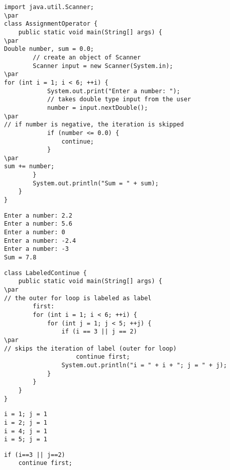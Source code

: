 \documentclass{book}
\def\lthtmlcheckvsize{\ifdim\ht\sizebox<\vsize 
  \ifdim\wd\sizebox<\hsize\expandafter\hfill\fi \expandafter\vfill
  \else\expandafter\vss\fi}%
\begin{document}
{\newpage\clearpage
{}%
\begin{lstlisting}
import java.util.Scanner;
\par
class AssignmentOperator {
    public static void main(String[] args) {
\par
Double number, sum = 0.0;
        // create an object of Scanner
        Scanner input = new Scanner(System.in);
\par
for (int i = 1; i < 6; ++i) {
            System.out.print("Enter a number: ");
            // takes double type input from the user
            number = input.nextDouble();
\par
// if number is negative, the iteration is skipped
            if (number <= 0.0) {
                continue;
            }
\par
sum += number;
        }
        System.out.println("Sum = " + sum);
    }
}
\end{lstlisting}%
\lthtmlfigureZ
\lthtmlcheckvsize\clearpage}

{\newpage\clearpage
{}%
\begin{lstlisting}
Enter a number: 2.2
Enter a number: 5.6
Enter a number: 0
Enter a number: -2.4
Enter a number: -3
Sum = 7.8
\end{lstlisting}%
\lthtmlfigureZ
\lthtmlcheckvsize\clearpage}

{\newpage\clearpage
{}%
\begin{lstlisting}
class LabeledContinue {
    public static void main(String[] args) {
\par
// the outer for loop is labeled as label      
        first:
        for (int i = 1; i < 6; ++i) {
            for (int j = 1; j < 5; ++j) {
                if (i == 3 || j == 2)
\par
// skips the iteration of label (outer for loop)
                    continue first;
                System.out.println("i = " + i + "; j = " + j); 
            }
        } 
    }
}
\end{lstlisting}%
\lthtmlfigureZ
\lthtmlcheckvsize\clearpage}

{\newpage\clearpage
{}%
\begin{lstlisting}
i = 1; j = 1
i = 2; j = 1
i = 4; j = 1
i = 5; j = 1
\end{lstlisting}%
\lthtmlfigureZ
\lthtmlcheckvsize\clearpage}

{\newpage\clearpage
{}%
\begin{lstlisting}
if (i==3 || j==2)
    continue first;
\end{lstlisting}%
\lthtmlfigureZ
\lthtmlcheckvsize\clearpage}
\end{document}
